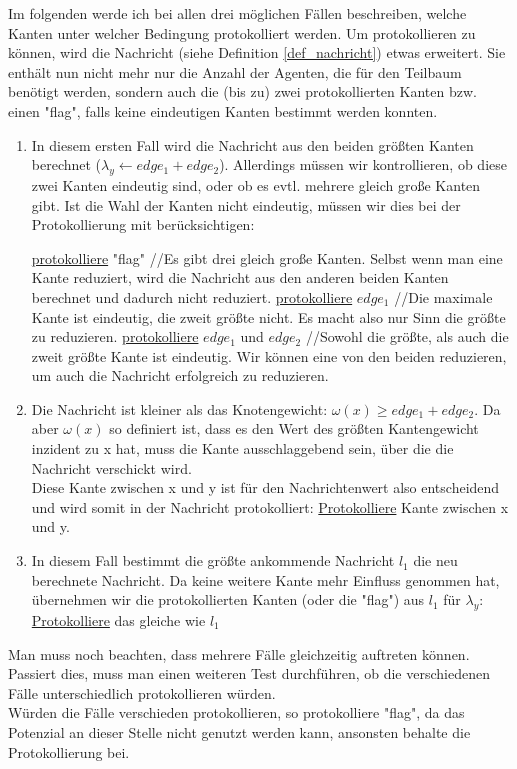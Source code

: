 Im folgenden werde ich bei allen drei möglichen Fällen beschreiben, welche Kanten unter welcher Bedingung protokolliert werden. Um protokollieren zu können, wird die Nachricht (siehe Definition \ref{def_nachricht}) etwas erweitert. Sie enthält nun nicht mehr nur die Anzahl der Agenten, die für den Teilbaum benötigt werden, sondern auch die (bis zu) zwei protokollierten Kanten bzw. einen "flag", falls keine eindeutigen Kanten bestimmt werden konnten.

\begin{enumerate}[label=\alph*)]
	
	\item In diesem ersten Fall wird die Nachricht aus den beiden größten Kanten berechnet ($\lambda_{y} \gets edge_{1} + edge_{2}$). Allerdings müssen wir kontrollieren, ob diese zwei Kanten eindeutig sind, oder ob es evtl. mehrere gleich große Kanten gibt. Ist die Wahl der Kanten nicht eindeutig, müssen wir dies bei der Protokollierung mit berücksichtigen:\\
	
		\begin{algorithmic}
			\State \uline{protokolliere} "flag"
			\State//Es gibt drei gleich große Kanten. Selbst wenn man eine Kante reduziert, wird die Nachricht aus den anderen beiden Kanten berechnet und dadurch nicht reduziert.
			\State \uline{protokolliere} $edge_{1}$
			\State//Die maximale Kante ist eindeutig, die zweit größte nicht. Es macht also nur Sinn die größte zu reduzieren.
			\Else
			\State \uline{protokolliere} $edge_{1}$ und $edge_{2}$
			\State//Sowohl die größte, als auch die zweit größte Kante ist eindeutig. Wir können eine von den beiden reduzieren, um auch die Nachricht erfolgreich zu reduzieren.
			\EndIf
		\end{algorithmic}
	
	\item Die Nachricht ist kleiner als das Knotengewicht: $\omega(x) \geq edge_{1}+edge_{2}$. Da aber $\omega(x)$ so definiert ist, dass es den Wert des größten Kantengewicht inzident zu x hat, muss die Kante ausschlaggebend sein, über die die Nachricht verschickt wird. 
	\\
	Diese Kante zwischen x und y ist für den Nachrichtenwert also entscheidend und wird somit in der Nachricht protokolliert: \uline{Protokolliere} Kante zwischen x und y.
	
	\item In diesem Fall bestimmt die größte ankommende Nachricht $l_{1}$ die neu berechnete Nachricht. Da keine weitere Kante mehr Einfluss genommen hat, übernehmen wir die protokollierten Kanten (oder die "flag") aus $l_{1}$ für $\lambda_{y}$: \uline{Protokolliere} das gleiche wie $l_{1}$
	
\end{enumerate}
Man muss noch beachten, dass mehrere Fälle gleichzeitig auftreten können. Passiert dies, muss man einen weiteren Test durchführen, ob die verschiedenen Fälle unterschiedlich protokollieren würden.
\\
Würden die Fälle verschieden protokollieren, so protokolliere "flag", da das Potenzial an dieser Stelle nicht genutzt werden kann, ansonsten behalte die Protokollierung bei.

